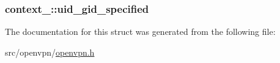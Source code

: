 \subsubsection[{uid\+\_\+gid\+\_\+specified}]{ context\+\_\+::uid\+\_\+gid\+\_\+specified}\label{structcontext__0_af599a649761ec7fd83b5aa3dab4a502e}


The documentation for this struct was generated from the following file\+:\begin{DoxyCompactItemize}
\item 
src/openvpn/\hyperlink{openvpn_8h}{openvpn.\+h}\end{DoxyCompactItemize}
